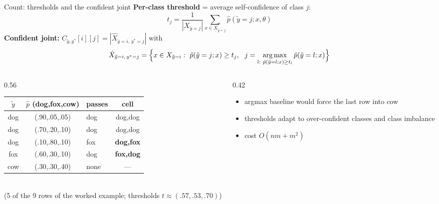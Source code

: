 \documentclass[aspectratio=169,10pt]{beamer}
\newcommand{\Cyy}{C_{\tilde y,y^*}}
\newcommand{\argmax}{\operatorname*{arg\,max}}
\begin{document}
\begin{frame}{Count: thresholds and the confident joint}
  \textbf{Per-class threshold} = average self-confidence of class $j$:
  \[ t_j=\frac{1}{|X_{\tilde y=j}|}\sum_{x\in X_{\tilde y=j}}\hat p(\tilde y=j;x,\theta) \]
  \textbf{Confident joint:}\; $\Cyy[i][j]=|\hat X_{\tilde y=i,\,y^*=j}|$ with
  \[
    \hat X_{\tilde y=i,\,y^*=j}=\Bigl\{x\in X_{\tilde y=i}:\ \hat p(\tilde y=j;x)\ge t_j,\ \ j=\argmax_{l:\ \hat p(\tilde y=l;x)\ge t_l}\hat p(\tilde y=l;x)\Bigr\}
  \]
  \vspace{-2pt}
  \begin{columns}[T]
    \begin{column}{0.56\textwidth}
      \small
      \begin{tabular}{@{}cclc@{}}
        \toprule
        $\tilde y$ & $\hat p$ (dog,fox,cow) & passes & cell\\
        \midrule
        dog & (.90,.05,.05) & dog & dog,dog\\
        dog & (.70,.20,.10) & dog & dog,dog\\
        dog & (.10,.80,.10) & fox & \textbf{dog,fox}\\
        fox & (.60,.30,.10) & dog & \textbf{fox,dog}\\
        cow & (.30,.30,.40) & none & ---\\
        \bottomrule
      \end{tabular}\\[2pt]
      {\scriptsize (5 of the 9 rows of the worked example; thresholds $t\approx(.57,.53,.70)$)}
    \end{column}
    \begin{column}{0.42\textwidth}
      \small
      \begin{itemize}
        \item argmax baseline would force the last row into cow
        \item thresholds adapt to over-confident classes and class imbalance
        \item cost $O(nm+m^2)$
      \end{itemize}
    \end{column}
  \end{columns}
\end{frame}
\end{document}
